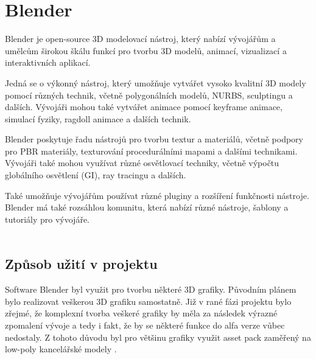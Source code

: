 \section{Blender}

Blender je open-source 3D modelovací nástroj, který nabízí vývojářům a umělcům širokou škálu funkcí pro tvorbu 3D modelů, animací, vizualizací a interaktivních aplikací.

Jedná se o výkonný nástroj, který umožňuje vytvářet vysoko kvalitní 3D modely pomocí různých technik, včetně polygonálních modelů, NURBS, sculptingu a dalších. Vývojáři mohou také vytvářet animace pomocí keyframe animace, simulací fyziky, ragdoll animace a dalších technik.

Blender poskytuje řadu nástrojů pro tvorbu textur a materiálů, včetně podpory pro PBR materiály, texturování procedurálními mapami a dalšími technikami. Vývojáři také mohou využívat různé osvětlovací techniky, včetně výpočtu globálního osvětlení (GI), ray tracingu a dalších. \cite{blender}

Také umožňuje vývojářům používat různé pluginy a rozšíření funkčnosti nástroje. Blender má také rozsáhlou komunitu, která nabízí různé nástroje, šablony a tutoriály pro vývojáře.
\\\\
\subsection{Způsob užití v projektu}

Software Blender byl využit pro tvorbu některé 3D grafiky. Původním plánem bylo realizovat veškerou 3D grafiku samostatně. Již v rané fázi projektu bylo zřejmé, že komplexní tvorba veškeré grafiky by měla za následek výrazné zpomalení vývoje a tedy i fakt, že by se některé funkce do alfa verze vůbec nedostaly. Z tohoto důvodu byl pro většinu grafiky využit asset pack zaměřený na low-poly kancelářské modely \cite{unity_asset}.
